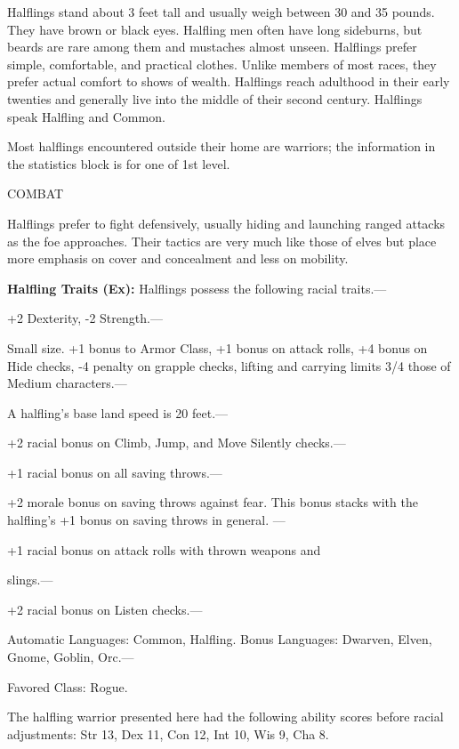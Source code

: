 \documentclass{article}
\begin{document}
Halflings stand about 3 feet tall and usually weigh between 30 and 35 pounds. They 
have brown or black eyes. Halfling men often have long sideburns, but beards are 
rare among them and mustaches almost unseen. Halflings prefer simple, comfortable, 
and practical clothes. Unlike members of most races, they prefer actual comfort 
to shows of wealth. Halflings reach adulthood in their early twenties and generally 
live into the middle of their second century. Halflings speak Halfling and Common.

Most halflings encountered outside their home are warriors; the information in 
the statistics block is for one of 1st level.

COMBAT

Halflings prefer to fight defensively, usually hiding and launching ranged attacks 
as the foe approaches. Their tactics are very much like those of elves but place 
more emphasis on cover and concealment and less on mobility.

\textbf{Halfling Traits (Ex):} Halflings possess the following racial traits.--- 

\parindent=3pt
+2 Dexterity, -2 Strength.---

\parindent=0pt
Small size. +1 bonus to Armor Class, +1 bonus on attack rolls, +4 bonus on Hide 
checks, -4 penalty on grapple checks, lifting and carrying limits 3/4 those of 
Medium characters.---

A halfling's base land speed is 20 feet.--- 

\parindent=3pt
+2 racial bonus on Climb, Jump, and Move Silently checks.--- 

+1 racial bonus on all saving throws.--- 

\parindent=7pt
+2 morale bonus on saving throws against fear. This bonus stacks with the halfling's 
+1 bonus on saving throws in general. --- 

\parindent=3pt
+1 racial bonus on attack rolls with thrown weapons and

\parindent=0pt
slings.--- 

\parindent=3pt
+2 racial bonus on Listen checks.---

\parindent=0pt
Automatic Languages: Common, Halfling. Bonus Languages: Dwarven, Elven, Gnome, 
Goblin, Orc.---

Favored Class: Rogue.

The halfling warrior presented here had the following ability scores before racial 
adjustments: Str 13, Dex 11, Con 12, Int 10, Wis 9, Cha 8.
\end{document}
